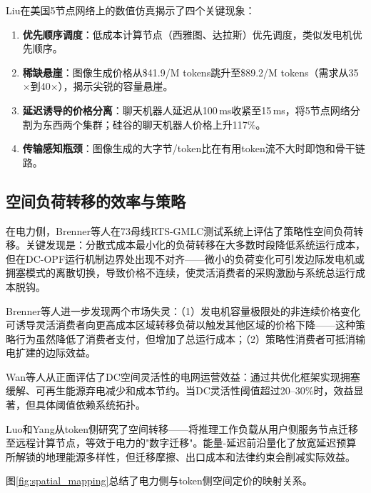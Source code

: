 \documentclass[11pt,twocolumn]{article}
\begin{document}
Liu\cite{liu2026locational}在美国5节点网络上的数值仿真揭示了四个关键现象：

\begin{enumerate}[leftmargin=*]
\item \textbf{优先顺序调度}：低成本计算节点（西雅图、达拉斯）优先调度，类似发电机优先顺序。
\item \textbf{稀缺悬崖}：图像生成价格从\$41.9/M tokens跳升至\$89.2/M tokens（需求从35$\times$到40$\times$），揭示尖锐的容量悬崖。
\item \textbf{延迟诱导的价格分离}：聊天机器人延迟从100\,ms收紧至15\,ms，将5节点网络分割为东西两个集群；硅谷的聊天机器人价格上升117\%。
\item \textbf{传输感知瓶颈}：图像生成的大字节/token比在有用token流不大时即饱和骨干链路。
\end{enumerate}

\subsection{空间负荷转移的效率与策略}

在电力侧，Brenner等人\cite{brenner2026spatial}在73母线RTS-GMLC测试系统上评估了策略性空间负荷转移。关键发现是：分散式成本最小化的负荷转移在大多数时段降低系统运行成本，但在DC-OPF运行机制边界处出现不对齐——微小的负荷变化可引发边际发电机或拥塞模式的离散切换，导致价格不连续，使灵活消费者的采购激励与系统总运行成本脱钩。

Brenner等人\cite{brenner2025strategic}进一步发现两个市场失灵：（1）发电机容量极限处的非连续价格变化可诱导灵活消费者向更高成本区域转移负荷以触发其他区域的价格下降——这种策略行为虽然降低了消费者支付，但增加了总运行成本；（2）策略性消费者可抵消输电扩建的边际效益。

Wan等人\cite{wan2025grid}从正面评估了DC空间灵活性的电网运营效益：通过共优化框架实现拥塞缓解、可再生能源弃电减少和成本节约。当DC灵活性阈值超过20--30\%时，效益显著，但具体阈值依赖系统拓扑。

Luo和Yang\cite{luo2026aiinference}从token侧研究了空间转移——将推理工作负载从用户侧服务节点迁移至远程计算节点，等效于电力的"数字迁移"。能量-延迟前沿量化了放宽延迟预算所解锁的地理能源多样性，但迁移摩擦、出口成本和法律约束会削减实际效益。

图\ref{fig:spatial_mapping}总结了电力侧与token侧空间定价的映射关系。
\end{document}
